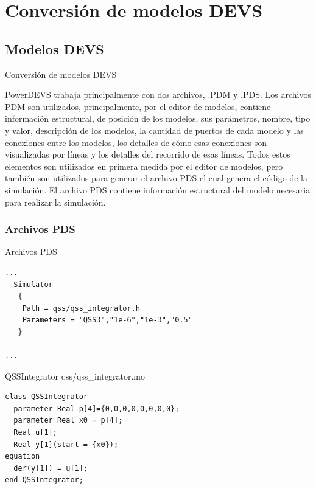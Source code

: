 \documentclass[10pt,handout]{beamer}
\begin{document}
\section{Conversión de modelos DEVS}
	\subsection{Modelos DEVS}
\begin{frame}{Conversión de modelos DEVS}
\begin{block}{PowerDEVS}
	trabaja principalmente con dos archivos, .PDM y .PDS.
        Los archivos PDM son utilizados, principalmente, por el editor de modelos, contiene información estructural, de posición de los modelos, sus parámetros, nombre, tipo y valor, descripción de los modelos, la cantidad de puertos de cada modelo y las conexiones entre los modelos, los detalles de cómo esas conexiones son visualizadas por líneas y los detalles del recorrido de esas líneas. 
        Todos estos elementos son utilizados en primera medida por el editor de modelos, pero también son utilizados para generar el archivo PDS el cual genera el código de la simulación.
        El archivo PDS contiene información estructural del modelo necesaria para realizar la simulación. 
\end{block}
\end{frame}
		\subsubsection{Archivos PDS}

\begin{frame}[fragile]{Archivos PDS}
\begin{verbatim}
...
  Simulator
   {
    Path = qss/qss_integrator.h
    Parameters = "QSS3","1e-6","1e-3","0.5"
   }
 
...
\end{verbatim}
\end{frame}

\begin{frame}[fragile]{QSSIntegrator}
\centering
    qss/qss\_integrator.mo
\begin{verbatim}
class QSSIntegrator
  parameter Real p[4]={0,0,0,0,0,0,0,0};
  parameter Real x0 = p[4];
  Real u[1];
  Real y[1](start = {x0});
equation
  der(y[1]) = u[1];
end QSSIntegrator;
\end{verbatim}
\end{frame}
\end{document}
